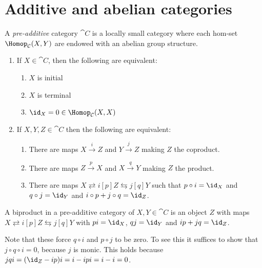 \documentclass[../main.tex]{subfiles}
\begin{document}
\chapter{Additive and abelian categories}
\begin{defn}
	A \emph{pre-additive} category $\cat C$ is a locally small category where each hom-set $\Hom_{\cat C}(X, Y)$ are endowed with an abelian group structure.
\end{defn}
\begin{lem}
\begin{enumerate}
	\item If $X \in \cat C$, then the following are equivalent:
	\begin{enumerate}
    	\item $X$ is initial
		\item $X$ is terminal
		\item $\id_X = 0 \in \Hom_{\cat C}(X,X)$
    \end{enumerate}
	\item If $X, Y, Z \in \cat C$ then the following are equivalent:
	\begin{enumerate}
    	\item There are maps $X \xrightarrow{i} Z$ and $Y \xrightarrow{j} Z$ making $Z$ the coproduct.
    	\item There are maps $Z \xrightarrow{p} X$ and $X \xrightarrow{q} Y$ making $Z$ the product.
		\item There are maps $X \rightleftarrows{i}[p] Z \leftrightarrows{j}[q] Y$ such that $p \circ i = \id_X$ and $q \circ j = \id_Y$ and $i\circ p + j \circ q = \id_Z$.
    \end{enumerate}

\end{enumerate}

\end{lem}

\begin{defn}
	A biproduct in a pre-additive category of $X, Y \in \cat C$ is an object $Z$ with maps $X \rightleftarrows{i}[p] Z \leftrightarrows{j}[q] Y$ with $pi = \id_X$, $qj = \id_Y$ and $ip + jq = \id_Z$.
\end{defn}
\begin{rmk}
	Note that these force $q \circ i$ and $p \circ j$ to be zero. To see this it suffices to show that $j \circ q \circ i = 0$, because $j$ is monic.
	This holds because $jqi = (\id_Z - ip)i = i - ipi = i - i = 0$.
\end{rmk}
\end{document}
